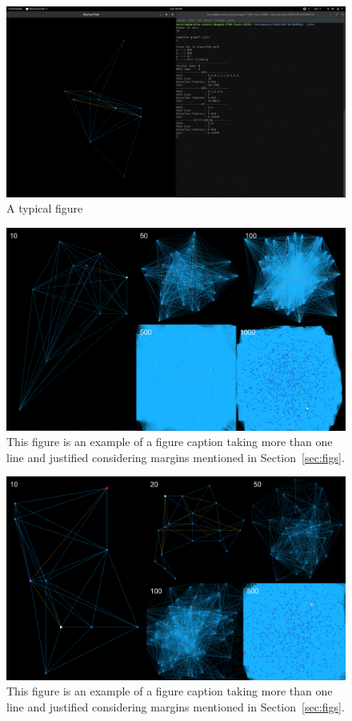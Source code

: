 \documentclass[12pt]{article}
\begin{document}
\begin{figure}[ht]
\centering
\includegraphics[width=1.0\textwidth]{Template_SBC/template-latex/screen1.png}
\caption{A typical figure}
\label{fig:exampleFig1}
\end{figure}

\begin{figure}[ht]
\centering
\includegraphics[width=1.0\textwidth]{Template_SBC/template-latex/grafoc.png}
\caption{This figure is an example of a figure caption taking more than one
  line and justified considering margins mentioned in Section~\ref{sec:figs}.}
\label{fig:exampleFig2}
\end{figure}

\begin{figure}[ht]
\centering
\includegraphics[width=1.0\textwidth]{Template_SBC/template-latex/grafonc.png}
\caption{This figure is an example of a figure caption taking more than one
  line and justified considering margins mentioned in Section~\ref{sec:figs}.}
\label{fig:exampleFig2}
\end{figure}
\end{document}
